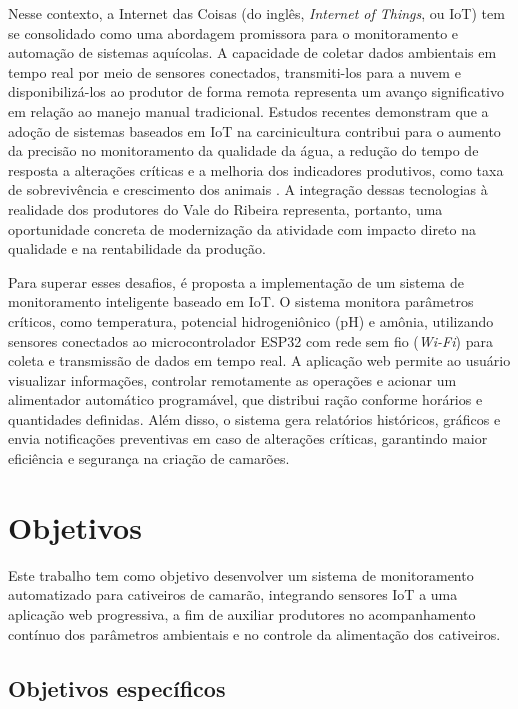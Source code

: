 \documentclass[11pt,a4paper]{article}
\begin{document}
Nesse contexto, a Internet das Coisas (do inglês, \textit{Internet of Things}, ou IoT) tem se consolidado como uma abordagem promissora para o monitoramento e automação de sistemas aquícolas. A capacidade de coletar dados ambientais em tempo real por meio de sensores conectados, transmiti-los para a nuvem e disponibilizá-los ao produtor de forma remota representa um avanço significativo em relação ao manejo manual tradicional. Estudos recentes demonstram que a adoção de sistemas baseados em IoT na carcinicultura contribui para o aumento da precisão no monitoramento da qualidade da água, a redução do tempo de resposta a alterações críticas e a melhoria dos indicadores produtivos, como taxa de sobrevivência e crescimento dos animais \cite{Uddin2020}. A integração dessas tecnologias à realidade dos produtores do Vale do Ribeira representa, portanto, uma oportunidade concreta de modernização da atividade com impacto direto na qualidade e na rentabilidade da produção.

Para superar esses desafios, é proposta a implementação de um sistema de monitoramento inteligente baseado em IoT. O sistema monitora parâmetros críticos, como temperatura, potencial hidrogeniônico (pH) e amônia, utilizando sensores conectados ao microcontrolador ESP32 com rede sem fio (\textit{Wi-Fi}) para coleta e transmissão de dados em tempo real. A aplicação web permite ao usuário visualizar informações, controlar remotamente as operações e acionar um alimentador automático programável, que distribui ração conforme horários e quantidades definidas. Além disso, o sistema gera relatórios históricos, gráficos e envia notificações preventivas em caso de alterações críticas, garantindo maior eficiência e segurança na criação de camarões.

\section{Objetivos}

Este trabalho tem como objetivo desenvolver um sistema de monitoramento automatizado para cativeiros de camarão, integrando sensores IoT a uma aplicação web progressiva, a fim de auxiliar produtores no acompanhamento contínuo dos parâmetros ambientais e no controle da alimentação dos cativeiros.

\subsection{Objetivos específicos}
\end{document}
